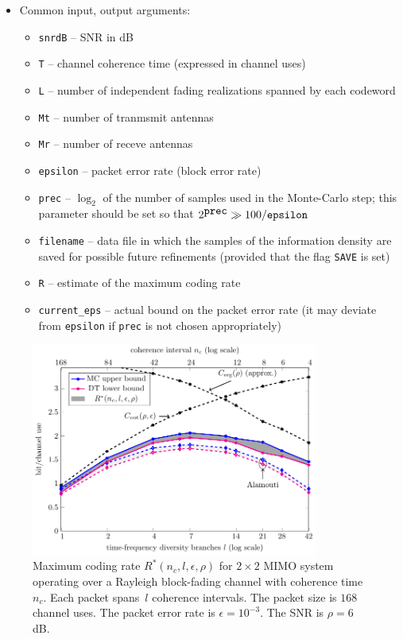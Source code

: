 \documentclass[a4paper,11p]{memoir}
\begin{document}
\begin{itemize}
  
  \item Common input, output arguments: 
  \begin{itemize}
    \item \verb|snrdB| -- SNR in dB
    \item \verb|T| -- channel coherence time (expressed in channel uses)
    \item \verb|L| -- number of independent fading realizations spanned by each codeword
    \item \verb|Mt| -- number of tranmsmit antennas
    \item \verb|Mr| -- number of receve antennas
    \item \verb|epsilon| -- packet error rate (block error rate)
    \item \verb|prec| -- $\log_2$ of the number of samples used in the Monte-Carlo step; this parameter should be set so that $2^{\verb|prec|} \gg 100 / \verb|epsilon|$
    \item \verb|filename| -- data file in which the samples of the information density are saved for possible future refinements (provided that the flag \verb|SAVE| is set)
    \item \verb|R| -- estimate of the maximum coding rate
    \item \verb|current_eps| -- actual bound on the packet error rate (it may  deviate from \verb|epsilon| if \verb|prec| is not chosen appropriately)
  \end{itemize}
  
\end{itemize}

   \begin{figure}[t]
    \centering
      \includegraphics[height=7cm]{./plots/snr6eps03M2.pdf}
    \caption{Maximum coding rate $R^\ast(n_c,l,\epsilon,\rho)$ for $2\times 2$ MIMO system operating over a Rayleigh block-fading channel with coherence time $n_c$.
    Each packet spans~$l$ coherence intervals. The packet size is $168$ channel uses. The packet error rate is $\epsilon=10^{-3}$.
    The SNR is $\rho=6$ dB.}
    \label{fig:snr6eps03M2}
  \end{figure}
  
\end{document}
